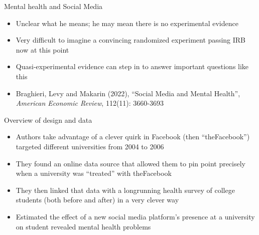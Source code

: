 \documentclass{beamer}
\begin{document}
\begin{frame}{Mental health and Social Media}

\begin{itemize}
\item Unclear what he means; he may mean there is no experimental evidence
\item Very difficult to imagine a convincing randomized experiment passing IRB now at this point
\item Quasi-experimental evidence can step in to answer important questions like this
\item Braghieri, Levy and Makarin (2022), ``Social Media and Mental Health'', \emph{American Economic Review}, 112(11): 3660-3693


\end{itemize}

\end{frame}

\begin{frame}{Overview of design and data}

\begin{itemize}
\item Authors take advantage of a clever quirk in Facebook (then ``theFacebook'') targeted different universities from 2004 to 2006
\item They found an online data source that allowed them to pin point precisely when a university was ``treated'' with theFacebook
\item They then linked that data with a longrunning health survey of college students (both before and after) in a very clever way
\item Estimated the effect of a new social media platform's presence at a university on student revealed mental health problems

\end{itemize}

\end{frame}
\end{document}
